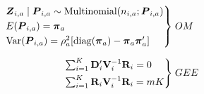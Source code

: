 \documentclass[preview,border={-60pt 10pt -60pt -2pt},convert]{standalone}
\begin{document}
	\begin{align*}
		\begin{rcases}%
			&\vb*{Z}_{i, a} \mid \vb*{P}_{i, a} \sim \textrm{Multinomial}(n_{i, a}; \vb*{P}_{i, a}) \\
			&E(\vb*{P}_{i, a}) = \vb*{\pi}_a \\
			&\mathrm{Var}(\vb*{P}_{i, a}) = \rho^2_a [\mathrm{diag}(\vb*{\pi}_a) - \vb*{\pi}_a \vb*{\pi}_a'] \\
		\end{rcases} &\;OM \\[7pt]
		\begin{rcases}%
			&\sum_{i=1}^K \vb{D}_i' \vb{V}_i^{-1} \vb{R}_i = 0 \\
			&\sum_{i=1}^K \vb{R}_i \vb{V}_i^{-1} \vb{R}_i = mK
		\end{rcases} &\;GEE
	\end{align*}
\end{document}
